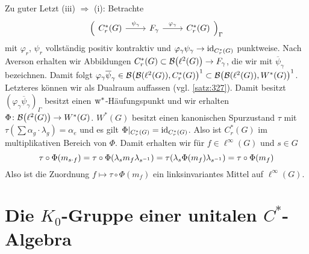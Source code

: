 \begin{beweis}[name={von \autoref{satz:53}}]
	Zu guter Letzt (iii) $\Rightarrow$ (i):
	Betrachte
	\[
		\Big(  
		\begin{tikzcd}
			C_r^*(G) \rar["\psi_\gamma"] & F_\gamma \rar["\varphi_\gamma"] & C_r^*(G)
		\end{tikzcd}
		\Big)_{\Gamma}
	\]
	mit $\varphi_r$, $\psi_r$ vollständig positiv kontraktiv und $\varphi_\gamma \psi_\gamma \to \operatorname{id}_{C^*_r(G)}$ punktweise.
	Nach Averson erhalten wir Abbildungen $C_r^*(G) \subset \mathcal{B} \enbrace*{\ell^2(G)} \to F_\gamma$, die wir mit $\overline{\psi}_\gamma$ bezeichnen.
	Damit folgt $\varphi_\gamma \overline{\psi}_\gamma \in \mathcal{B} \enbrace[\big]{ \mathcal{B}(\ell^2(G)), C_r^*(G)}^1 \subset \mathcal{B} \enbrace*{\mathcal{B}(\ell^2(G)), W^*(G)}^1$.
	Letzteres können wir als Dualraum auffassen (vgl. \autoref{satz:327}).
	Damit besitzt $(\varphi_\gamma \overline{\psi}_\gamma)_\Gamma$ besitzt einen $\mkern1mu\mathrm{w}^*$-Häufungspunkt und wir erhalten $\Phi \colon \mathcal{B} \enbrace*{\ell^2(G)} \to W^*(G)$.
	$W^*(G)$ besitzt einen kanonischen Spurzustand $\tau$ mit $\tau(\sum \alpha_g \cdot \lambda_g) = \alpha_e$ und es gilt $\Phi|_{C^*_r(G)} = \operatorname{id}_{C_r^*(G)}$.
	Also ist $C^*_r(G)$ im multiplikativen Bereich von $\Phi$.
	Damit erhalten wir für $f \in \ell^\infty(G)$ und $s \in G$ 
	\[
		\tau \circ \Phi(m_{s \cdot f}) = \tau \circ \Phi(\lambda_s m_f \lambda_{s^{-1}}) = \tau \enbrace*{\lambda_s \Phi(m_f) \lambda_{s^{-1}}} =\tau \circ \Phi(m_f)
	\]
	Also ist die Zuordnung $f \mapsto \tau \circ \Phi(m_f)$ ein linksinvariantes Mittel auf $\ell^\infty(G)$. 
\end{beweis}
\newpage


\section{Die $K_0$-Gruppe einer unitalen $C^*$-Algebra} %
\label{sec:6}

